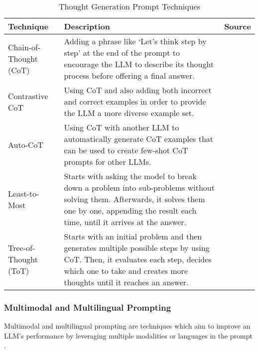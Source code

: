 \begin{table}[h!]
    \centering
    \begin{tabular}{p{3cm} p{8cm} p{2cm}}
        \toprule
        \textbf{Technique} & \textbf{Description} & \textbf{Source} \\
        \midrule
        \raggedright
        Chain-of-Thought (CoT) & Adding a phrase like `Let's think step by step' at the end of the prompt to encourage the LLM to describe its thought process before offering a final answer. & \textcite{cot} \\
        \hline
        \raggedright
        Contrastive CoT & Using CoT and also adding both incorrect and correct examples in order to provide the LLM a more diverse example set.  & \textcite{contrastive-cot} \\
        \hline
        \raggedright
        Auto-CoT & Using CoT with another LLM to automatically generate CoT examples that can be used to create few-shot CoT prompts for other LLMs. &  \textcite{auto-cot} \\
        \hline
        \raggedright
        Least-to-Most & Starts with asking the model to break down a problem into sub-problems without solving them. Afterwards, it solves them one by one, appending the result each time, until it arrives at the answer. & \textcite{least-most} \\
        \hline
        \raggedright
        Tree-of-Thought (ToT) & Starts with an initial problem and then generates multiple possible steps by using CoT. Then, it evaluates each step, decides which one to take and creates more thoughts until it reaches an answer. & \textcite{treeofthought} \\
        \bottomrule
    \end{tabular}
    \caption{Thought Generation Prompt Techniques}\label{tab:thought_gen}
\end{table}

\FloatBarrier{}

\subsubsection{Multimodal and Multilingual Prompting}

Multimodal and multilingual prompting are techniques which aim to improve an LLM's performance by leveraging multiple modalities or languages in the prompt \parencite{prompt1}.

